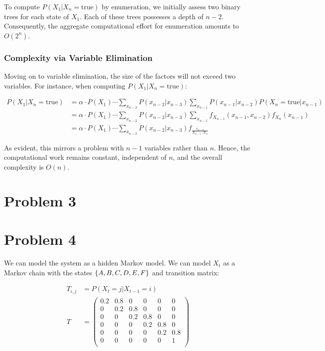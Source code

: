 \documentclass[12pt]{article}
\begin{document}
To compute 
$P(X_1 | X_n = \text{true})$ 
by enumeration, 
we initially assess two binary trees for each state of $X_1$. 
Each of these trees possesses a depth of $n - 2$. 
Consequently, 
the aggregate computational effort for enumeration amounts to $\boxed{O(2^n)}$.

\subsubsection{Complexity via Variable Elimination}

Moving on to variable elimination, 
the size of the factors will not exceed two variables. 
For instance, 
when computing $P(X_1 | X_n = \text{true})$:

\begin{align*}
P(X_1 | X_n = \text{true})
& = \alpha \cdot P(X_1) \cdots \sum_{x_{n-2}} P(x_{n-2} | x_{n-3}) \sum_{x_{n-1}} P(x_{n-1} | x_{n-2}) P(X_n = \text{true} | x_{n-1}) \\
& = \alpha \cdot P(X_1) \cdots \sum_{x_{n-2}} P(x_{n-2} | x_{n-3}) \sum_{x_{n-1}} f_{X_{n-1}}(x_{n-1}, x_{n-2}) f_{X_n}(x_{n-1}) \\
& = \alpha \cdot P(X_1) \cdots \sum_{x_{n-2}} P(x_{n-2} | x_{n-3}) f_{\frac{x_{n-2}}{X_{n-1} \cdot X_n}}
\end{align*}

As evident, 
this mirrors a problem with $n-1$ variables rather than $n$. 
Hence, 
the computational work remains constant, 
independent of $n$, 
and the overall complexity is $\boxed{O(n)}$.


\section{Problem 3}

\section{Problem 4}

We can model the system as a hidden Markov model.
We can model $X_t$ as a Markov chain with the states 
$\left \{ A, B, C, D, E, F \right \}$ 
and transition matrix:

\begin{align*}
    T_{i, j} &= P(X_t = j| X_{t-1} = i) \\
    T &= 
    \begin{pmatrix}
        0.2 & 0.8 & 0 & 0 & 0 & 0 \\
        0 & 0.2 & 0.8 & 0 & 0 & 0 \\
        0 & 0 & 0.2 & 0.8 & 0 & 0 \\
        0 & 0 & 0 & 0.2 & 0.8 & 0 \\
        0 & 0 & 0 & 0 & 0.2 & 0.8 \\
        0 & 0 & 0 & 0 & 0 & 1 \\
    \end{pmatrix}
\end{align*}
\end{document}
